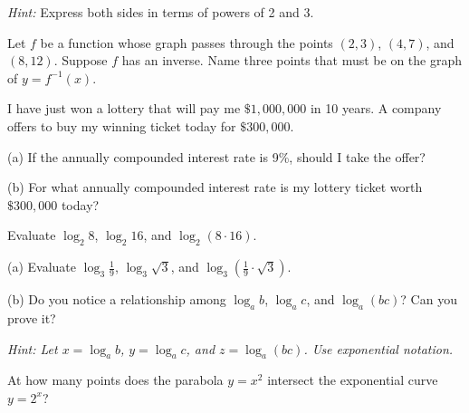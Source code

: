 \documentclass[12pt]{exam}
\begin{document}
\begin{questions}
\textit{Hint:} Express both sides in terms of powers of 2 and 3.
\vspace*{4cm}

\question[8]
Let $f$ be a function whose graph passes through the points $(2, 3)$, $(4, 7)$, and $(8, 12)$. Suppose $f$ has an inverse. Name three points that must be on the graph of $y = f^{-1}(x)$.
\vspace*{4cm}

\question[10]
I have just won a lottery that will pay me $\$1,000,000$ in 10 years. A company offers to buy my winning ticket today for $\$300,000$.

(a) If the annually compounded interest rate is 9\%, should I take the offer?
\vspace*{3cm}

(b) For what annually compounded interest rate is my lottery ticket worth $\$300,000$ today?
\vspace*{3cm}

\newpage

\question[12]
Evaluate $\log_2 8$, $\log_2 16$, and $\log_2(8 \cdot 16)$.

(a) Evaluate $\log_3 \frac{1}{9}$, $\log_3 \sqrt{3}$, and $\log_3 \left(\frac{1}{9} \cdot \sqrt{3}\right)$.
\vspace*{3cm}

(b) Do you notice a relationship among $\log_a b$, $\log_a c$, and $\log_a(bc)$? Can you prove it?

\textit{Hint: Let $x = \log_a b$, $y = \log_a c$, and $z = \log_a(bc)$. Use exponential notation.}
\vspace*{4cm}

\question[8]
At how many points does the parabola $y = x^2$ intersect the exponential curve $y = 2^x$?
\vspace*{4cm}

\newpage

\end{questions}
\end{document}
